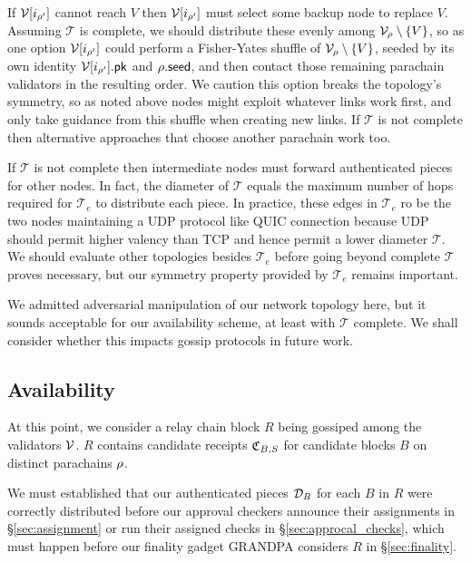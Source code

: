 If $\mathcal{V}[i_{\rho'}]$ cannot reach $V$ then $\mathcal{V}[i_{\rho'}]$ must select some backup node to replace $V$.  Assuming $\mathcal{T}$ is complete, we should distribute these evenly among $\mathcal{V}_{\rho} \setminus \{V\}$, so as one option $\mathcal{V}[i_{\rho'}]$ could perform a Fisher-Yates shuffle of $\mathcal{V}_{\rho} \setminus \{V\}$, seeded by its own identity $\mathcal{V}[i_{\rho'}].\mathsf{pk}$ and $\rho.\mathsf{seed}$, and then contact those remaining parachain validators in the resulting order.  We caution this option breaks the topology's symmetry, so as noted above nodes might exploit whatever links work first, and only take guidance from this shuffle when creating new links.  If $\mathcal{T}$ is not complete then alternative approaches that choose another parachain work too.  

If $\mathcal{T}$ is not complete then intermediate nodes must forward authenticated pieces for other nodes.  In fact, the diameter of $\mathcal{T}$ equals the maximum number of hops required for $\mathcal{T}_e$ to distribute each piece.  
In practice, these edges in $\mathcal{T}_e$ ro be the two nodes
maintaining a UDP protocol like QUIC connection because UDP should permit higher valency than TCP and hence permit a lower diameter $\mathcal{T}$.  
We should evaluate other topologies besides $\mathcal{T}_e$ before going beyond complete $\mathcal{T}$ proves necessary, but our symmetry property provided by $\mathcal{T}_e$ remains important. 

We admitted adversarial manipulation of our network topology here, but it sounds acceptable for our availability scheme, at least with $\mathcal{T}$ complete.  We shall consider whether this impacts gossip protocols in future work. 


\subsection{Availability}
\label{subsec:availability}  %

At this point, we consider a relay chain block $R$ being gossiped among the validators $\mathcal{V}$.  $R$ contains candidate receipts $\mathfrak{C}_{B,S}$ for candidate blocks $B$ on distinct parachains $\rho$.  

We must established that our authenticated pieces $\mathcal{D}_B$ for each $B$ in $R$ were correctly distributed before our approval checkers announce their assignments in \S\ref{sec:assignment} or run their assigned checks in \S\ref{sec:approcal_checks}, which must happen before our finality gadget GRANDPA considers $R$ in \S\ref{sec:finality}.  

